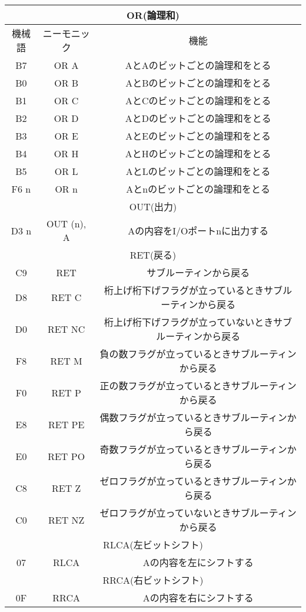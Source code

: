 \begin{center}
\begin{tabular}{|c|c|c|}

\hline
\multicolumn{3}{|c|}{OR(論理和)}\\
\hline
機械語& ニーモニック& 機能 \\ \hline
B7& OR A& AとAのビットごとの論理和をとる\\ \hline
B0& OR B& AとBのビットごとの論理和をとる\\ \hline
B1& OR C& AとCのビットごとの論理和をとる\\ \hline
B2& OR D& AとDのビットごとの論理和をとる\\ \hline
B3& OR E& AとEのビットごとの論理和をとる\\ \hline
B4& OR H& AとHのビットごとの論理和をとる\\ \hline
B5& OR L& AとLのビットごとの論理和をとる\\ \hline
F6 n& OR  n& Aとnのビットごとの論理和をとる \\ \hline
\hline
\multicolumn{3}{|c|}{OUT(出力)}\\
\hline
D3 n& OUT (n), A & Aの内容をI/Oポートnに出力する \\ \hline
\hline
\multicolumn{3}{|c|}{RET(戻る)}\\
\hline
C9 &RET & サブルーティンから戻る \\ \hline
D8 &RET C& 桁上げ桁下げフラグが立っているときサブルーティンから戻る \\ \hline
D0 &RET NC& 桁上げ桁下げフラグが立っていないときサブルーティンから戻る \\ \hline
F8 &RET M& 負の数フラグが立っているときサブルーティンから戻る \\ \hline
F0 &RET P& 正の数フラグが立っているときサブルーティンから戻る \\ \hline
E8 &RET PE& 偶数フラグが立っているときサブルーティンから戻る \\ \hline
E0 &RET PO& 奇数フラグが立っているときサブルーティンから戻る \\ \hline
C8 &RET Z& ゼロフラグが立っているときサブルーティンから戻る \\ \hline
C0 &RET NZ& ゼロフラグが立っていないときサブルーティンから戻る \\ \hline
\hline
\multicolumn{3}{|c|}{RLCA(左ビットシフト)}\\
\hline
07&  RLCA& Aの内容を左にシフトする\\ \hline
\hline
\multicolumn{3}{|c|}{RRCA(右ビットシフト)}\\
\hline
0F&  RRCA& Aの内容を右にシフトする\\ \hline

\end{tabular}
\end{center}
